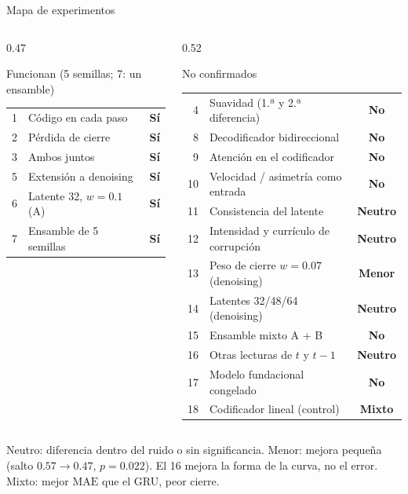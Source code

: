 \documentclass[aspectratio=169,10pt,t]{beamer}
\newcommand{\mae}{\ensuremath{\mathrm{MAE}}}
\newcommand{\men}{\textcolor{naranja}{\textbf{Menor}}}
\newcommand{\ok}{\textcolor{verde}{\textbf{Sí}}}
\newcommand{\no}{\textcolor{rojo}{\textbf{No}}}
\newcommand{\neu}{\textcolor{naranja}{\textbf{Neutro}}}
\begin{document}
\begin{frame}{Mapa de experimentos}
\begin{columns}[T]
\begin{column}{0.47\textwidth}
\begin{exampleblock}{Funcionan (5 semillas; 7: un ensamble)}
\small
\begin{tabular}{@{}rlc@{}}
1 & Código en cada paso & \ok\\
2 & Pérdida de cierre & \ok\\
3 & Ambos juntos & \ok\\
5 & Extensión a denoising & \ok\\
6 & Latente 32, $w=0.1$ (A) & \ok\\
7 & Ensamble de 5 semillas & \ok\\
\end{tabular}
\end{exampleblock}
\end{column}
\begin{column}{0.52\textwidth}
\begin{alertblock}{No confirmados}
\small
\begin{tabular}{@{}rlc@{}}
4 & Suavidad (1.ª y 2.ª diferencia) & \no\\
8 & Decodificador bidireccional & \no\\
9 & Atención en el codificador & \no\\
10 & Velocidad / asimetría como entrada & \no\\
11 & Consistencia del latente & \neu\\
12 & Intensidad y currículo de corrupción & \neu\\
13 & Peso de cierre $w=0.07$ (denoising) & \men\\
14 & Latentes 32/48/64 (denoising) & \neu\\
15 & Ensamble mixto A + B & \no\\
16 & Otras lecturas de $t$ y $t-1$ & \neu\\
17 & Modelo fundacional congelado & \no\\
18 & Codificador lineal (control) & \textcolor{naranja}{\textbf{Mixto}}\\
\end{tabular}
\end{alertblock}
\end{column}
\end{columns}
\vspace{2pt}
{\scriptsize Neutro: diferencia dentro del ruido o sin significancia. Menor: mejora pequeña (salto $0.57\to0.47$, $p=0.022$). El 16 mejora la forma de la curva, no el error. Mixto: mejor \mae{} que el GRU, peor cierre.}
\end{frame}
\end{document}
